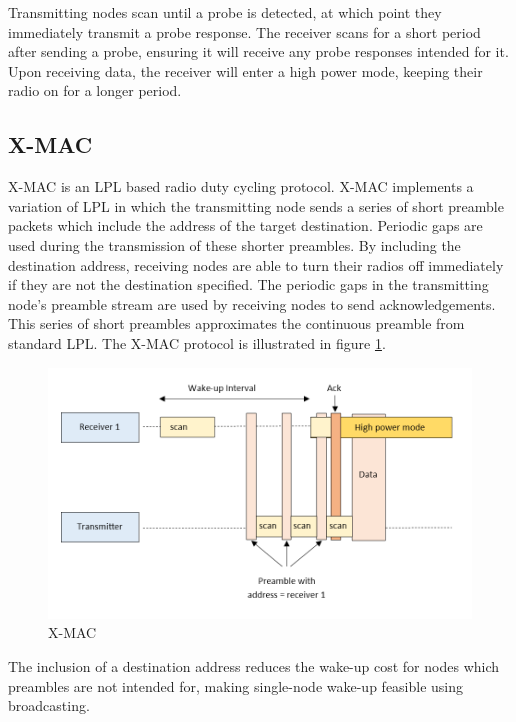     Transmitting nodes scan until a probe is detected, at
    which point they immediately transmit a probe response. The receiver scans for a short
    period after sending a probe, ensuring it will receive any probe responses
    intended for it. Upon receiving data, the receiver will enter a high power mode,
    keeping their radio on for a longer period.

      \subsection{X-MAC}
    X-MAC \cite{XMAC} is an LPL based radio duty cycling protocol. X-MAC implements
    a variation of LPL in which the transmitting node sends a series of short
    preamble packets which include the address of the target destination. Periodic gaps
    are used during the transmission of these shorter preambles. By including the
    destination address, receiving nodes are able to turn their radios off immediately
    if they are not the destination specified. The periodic gaps in the transmitting node's
    preamble stream are used by receiving nodes to send acknowledgements. This
    series of short preambles approximates the continuous preamble from standard
    LPL. The X-MAC protocol is illustrated in figure \ref{fig:xmac}.

    \FloatBarrier
    \begin{figure}[ht]
      \includegraphics[width=\textwidth]{Images/chapter2/xmac.png}
      \caption{X-MAC}
      \label{fig:xmac}
    \end{figure}
    \FloatBarrier

    The inclusion of a destination address reduces the wake-up cost for nodes which
    preambles are not intended for, making single-node wake-up feasible using
    broadcasting.

